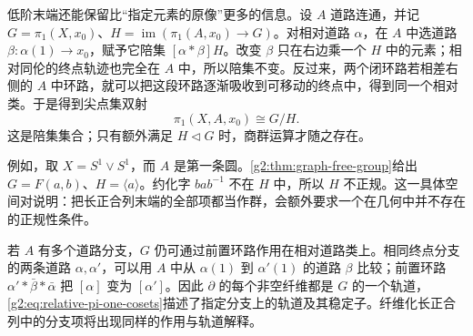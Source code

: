 低阶末端还能保留比“指定元素的原像”更多的信息。设 \(A\) 道路连通，并记 \(G=\pi_1(X,x_0)\)、\(H=\operatorname{im}(\pi_1(A,x_0)\to G)\)。对相对道路 \(\alpha\)，在 \(A\) 中选道路 \(\beta:\alpha(1)\to x_0\)，赋予它陪集 \([\alpha*\beta]H\)。改变 \(\beta\) 只在右边乘一个 \(H\) 中的元素；相对同伦的终点轨迹也完全在 \(A\) 中，所以陪集不变。反过来，两个闭环路若相差右侧的 \(A\) 中环路，就可以把这段环路逐渐吸收到可移动的终点中，得到同一个相对类。于是得到尖点集双射
\begin{equation}\label{g2:eq:relative-pi-one-cosets}
	\pi_1(X,A,x_0)\cong G/H.
\end{equation}
这是陪集集合；只有额外满足 \(H\triangleleft G\) 时，商群运算才随之存在。

例如，取 \(X=S^1\vee S^1\)，而 \(A\) 是第一条圆。\cref{g2:thm:graph-free-group}给出 \(G=F(a,b)\)、\(H=\langle a\rangle\)。约化字 \(bab^{-1}\) 不在 \(H\) 中，所以 \(H\) 不正规。这一具体空间对说明：把长正合列末端的全部项都当作群，会额外要求一个在几何中并不存在的正规性条件。

若 \(A\) 有多个道路分支，\(G\) 仍可通过前置环路作用在相对道路类上。相同终点分支的两条道路 \(\alpha,\alpha'\)，可以用 \(A\) 中从 \(\alpha(1)\) 到 \(\alpha'(1)\) 的道路 \(\beta\) 比较；前置环路 \(\alpha'*\bar\beta*\bar\alpha\) 把 \([\alpha]\) 变为 \([\alpha']\)。因此 \(\partial\) 的每个非空纤维都是 \(G\) 的一个轨道，\eqref{g2:eq:relative-pi-one-cosets}描述了指定分支上的轨道及其稳定子。纤维化长正合列中的分支项将出现同样的作用与轨道解释。
